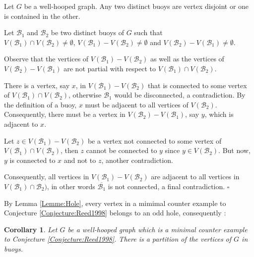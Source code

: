 \documentclass{amsart}
\newtheorem{cor}[thm]{Corollary}
\theoremstyle{definition}
\theoremstyle{remark}
\newenvironment{prf}{{\bf \noindent Proof. } }{\hfill$\square$\\}
\newcommand{\wh}{well-hooped\xspace}
\newcommand{\extB}{buoy\xspace}
\newcommand{\extBs}{buoys\xspace}
\begin{document}
\begin{thm} \label{Theorem:Structure_Extended_bouées} 
Let $G$ be a \wh graph. Any two distinct \extBs are vertex disjoint or one is contained in the other.
\end{thm}
\begin{prf}
Let $\mathcal{B}_1$ and $\mathcal{B}_2$ be two distinct \extBs of $G$ such that \\
$V(\mathcal{B}_1)\cap V(\mathcal{B}_2)\neq\emptyset$, $V(\mathcal{B}_1)-V(\mathcal{B}_2)\neq\emptyset$ and $V(\mathcal{B}_2)-V(\mathcal{B}_1)\neq\emptyset$. 

Observe that the vertices of $V(\mathcal{B}_1)-V(\mathcal{B}_2)$ 
as well as the vertices of $V(\mathcal{B}_2)-V(\mathcal{B}_1)$ are not partial with respect to $V(\mathcal{B}_1)\cap V(\mathcal{B}_2)$.

There is a vertex, say $x$, in $V(\mathcal{B}_1)-V(\mathcal{B}_2)$ that is connected to some vertex of $V(\mathcal{B}_1)\cap V(\mathcal{B}_2)$, otherwise $\mathcal{B}_1$ would be disconnected, a contradiction.
By the definition of a \extB, $x$ must be adjacent to all vertices of $V(\mathcal{B}_2)$.
Consequently, there must be a vertex in $V(\mathcal{B}_2)-V(\mathcal{B}_1)$, say $y$, which is adjacent to $x$.

Let $z\in V(\mathcal{B}_1)-V(\mathcal{B}_2)$ be a vertex not connected to some vertex of  $V(\mathcal{B}_1)\cap V(\mathcal{B}_2)$, then $z$ cannot be connected to $y$ since $y\in V(\mathcal{B}_2)$. 
But now, $y$ is connected to $x$ and not to $z$, another contradiction.

Consequently, all vertices in $V(\mathcal{B}_1)-V(\mathcal{B}_2)$ are adjacent to all vertices in $V(\mathcal{B}_1)\cap\mathcal{B}_2)$, in other words $\overline{\mathcal{B}_1}$ is not connected, a final contradiction.
\end{prf}

By Lemma \ref{Lemme:Hole}, every vertex in a mimimal counter example to Conjecture \ref{Conjecture:Reed1998} belongs to an odd hole, consequently :
\begin{cor}\label{cor:PartitionStroumpfGraphEnExtendedBuoys}
 Let $G$ be a \wh graph  which is a minimal counter example to Conjecture \ref{Conjecture:Reed1998}. There is a partition of the vertices of $G$ in \extBs.
\end{cor}
\end{document}

